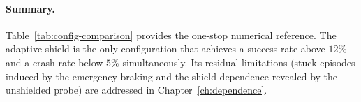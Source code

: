\paragraph{Summary.}
Table~\ref{tab:config-comparison} provides the one-stop numerical reference. The adaptive
shield is the only configuration that achieves a success rate above \(12\%\) and a crash
rate below \(5\%\) simultaneously. Its residual limitations (stuck episodes induced by
the emergency braking and the shield-dependence revealed by the unshielded probe) are
addressed in Chapter~\ref{ch:dependence}.

\clearpage
